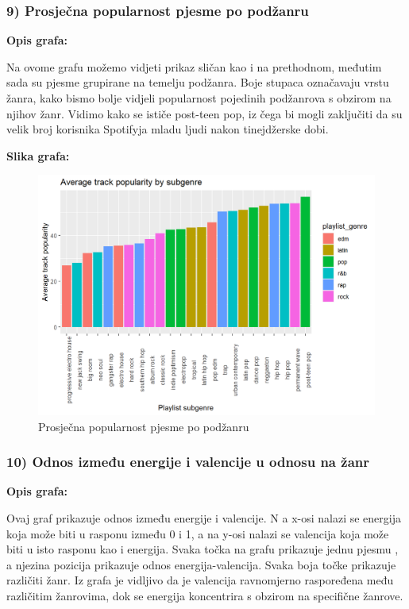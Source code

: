 	
	\subsubsection{9) Prosječna popularnost pjesme po podžanru}
	
	\textbf{Opis grafa:}
	
	Na ovome grafu možemo vidjeti prikaz sličan kao i na prethodnom, međutim sada su pjesme grupirane na temelju podžanra. Boje stupaca označavaju vrstu žanra, kako bismo bolje vidjeli popularnost pojedinih podžanrova s obzirom na njihov žanr.
	Vidimo kako se ističe post-teen pop, iz čega bi mogli zaključiti da su velik broj korisnika Spotifyja mladu ljudi nakon tinejdžerske dobi.
	
	\textbf{Slika grafa:}
	\begin{figure}[H]
		\includegraphics[scale=0.9]{slike/subgenre.png}
		\centering
		\caption{Prosječna popularnost pjesme po podžanru}
		
	\end{figure}


		\subsubsection{10) Odnos između energije i valencije u odnosu na žanr}
    
    \textbf{Opis grafa:}
    
    	Ovaj graf prikazuje odnos između energije i valencije. N a x-osi nalazi se energija koja može biti u rasponu između 0 i 1, a na y-osi nalazi se valencija koja može biti u isto rasponu kao i energija. Svaka točka na grafu prikazuje jednu pjesmu , a njezina pozicija prikazuje odnos energija-valencija. Svaka boja točke prikazuje različiti žanr. 
    	Iz grafa je vidljivo da je valencija ravnomjerno raspoređena među različitim žanrovima, dok se energija koncentrira s obzirom na specifične žanrove.
    
